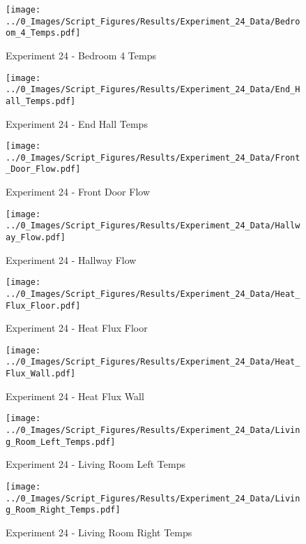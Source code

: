 	\begin{figure}[H]
		\centering
		\texttt{[image: ../0\_Images/Script\_Figures/Results/Experiment\_24\_Data/Bedroom\_4\_Temps.pdf]}
		\caption[]{Experiment 24 - Bedroom 4 Temps}
	\end{figure}
 
	\clearpage

	\begin{figure}[H]
		\centering
		\texttt{[image: ../0\_Images/Script\_Figures/Results/Experiment\_24\_Data/End\_Hall\_Temps.pdf]}
		\caption[]{Experiment 24 - End Hall Temps}
	\end{figure}
 

	\begin{figure}[H]
		\centering
		\texttt{[image: ../0\_Images/Script\_Figures/Results/Experiment\_24\_Data/Front\_Door\_Flow.pdf]}
		\caption[]{Experiment 24 - Front Door Flow}
	\end{figure}
 
	\clearpage

	\begin{figure}[H]
		\centering
		\texttt{[image: ../0\_Images/Script\_Figures/Results/Experiment\_24\_Data/Hallway\_Flow.pdf]}
		\caption[]{Experiment 24 - Hallway Flow}
	\end{figure}
 

	\begin{figure}[H]
		\centering
		\texttt{[image: ../0\_Images/Script\_Figures/Results/Experiment\_24\_Data/Heat\_Flux\_Floor.pdf]}
		\caption[]{Experiment 24 - Heat Flux Floor}
	\end{figure}
 
	\clearpage

	\begin{figure}[H]
		\centering
		\texttt{[image: ../0\_Images/Script\_Figures/Results/Experiment\_24\_Data/Heat\_Flux\_Wall.pdf]}
		\caption[]{Experiment 24 - Heat Flux Wall}
	\end{figure}
 

	\begin{figure}[H]
		\centering
		\texttt{[image: ../0\_Images/Script\_Figures/Results/Experiment\_24\_Data/Living\_Room\_Left\_Temps.pdf]}
		\caption[]{Experiment 24 - Living Room Left Temps}
	\end{figure}
 
	\clearpage

	\begin{figure}[H]
		\centering
		\texttt{[image: ../0\_Images/Script\_Figures/Results/Experiment\_24\_Data/Living\_Room\_Right\_Temps.pdf]}
		\caption[]{Experiment 24 - Living Room Right Temps}
	\end{figure}
 

